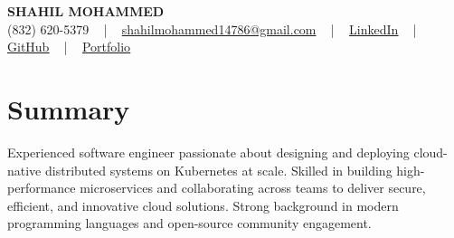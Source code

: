\documentclass[letterpaper,10pt]{article}
\begin{document}
\begin{center}
    {\fontsize{14pt}{12pt}\selectfont \textbf{\MakeUppercase{Shahil Mohammed}}}\\ \vspace{2pt}
    \fontsize{10pt}{12pt}\selectfont (832) 620-5379 ~ | ~ \href{mailto:shahilmohammed14786@gmail.com}{shahilmohammed14786@gmail.com} ~ | ~  
    \href{https://www.linkedin.com/in/shahil-mohammed-9652931a1/}{\color{blue}\underline{LinkedIn}}  ~ | ~ 
    \href{https://github.com/freakbeast14}{\color{blue}\underline{GitHub}} ~ | ~ 
    \href{https://shahil-mohammed.netlify.app/}{\color{blue}\underline{Portfolio}}
    \vspace{-8pt}
\end{center}

\section{Summary}
\vspace{-2pt}\fontsize{8pt}{9pt}\selectfont
Experienced software engineer passionate about designing and deploying cloud-native distributed systems on Kubernetes at scale. Skilled in building high-performance microservices and collaborating across teams to deliver secure, efficient, and innovative cloud solutions. Strong background in modern programming languages and open-source community engagement.
 \vspace{-5pt}
 
\vspace{-2pt}
\end{document}
